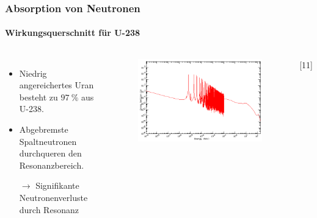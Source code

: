 \documentclass{beamer}[9pt]
\begin{document}
\begin{frame}
\end{frame}


\begin{frame}
\frametitle{Absorption von Neutronen}
\framesubtitle{Wirkungsquerschnitt für U-238}
\begin{columns}

\begin{itemize}
\item Niedrig angereichertes Uran besteht zu $\SI{97}{\percent}$ aus U-238.
\item Abgebremste Spaltneutronen durchqueren den Resonanzbereich.
\item [$\rightarrow$] Signifikante Neutronenverluste durch Resonanz
\end{itemize}


\begin{figure}
\includegraphics[scale=0.3]{u238_absorption_cs.jpg}
\end{figure}
\hspace{.5\columnwidth}[11]
\end{columns}
\end{frame}
\end{document}
